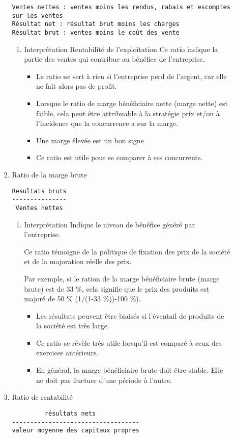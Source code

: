 \documentclass[11pt]{article}
\begin{document}
\begin{enumerate}
\begin{enumerate}
\begin{enumerate}
\begin{verbatim}
Ventes nettes : ventes moins les rendus, rabais et escomptes sur les ventes
Résultat net : résultat brut moins les charges
Résultat brut : ventes moins le coût des vente
\end{verbatim}
\begin{enumerate}
\item Interprétation
\label{sec:org16278c2}
Rentabilité de l'exploitation
Ce ratio indique la partie des ventes qui contribue au bénéfice de l'entreprise.
\begin{itemize}
\item Le ratio ne sert à rien si l'entreprise perd de l'argent, car elle ne fait
alors pas de profit.
\item Lorsque le ratio de marge bénéficiaire nette (marge nette) est faible, cela
peut être attribuable à la stratégie prix et/ou à l'incidence que la
concurrence a sur la marge.
\item Une marge élevée est un bon signe
\item Ce ratio est utile pour se comparer à ses concurrents.
\end{itemize}
\end{enumerate}
\item Ratio de la marge brute
\label{sec:orgbc4a7e3}
\begin{verbatim}
Resultats bruts
---------------
 Ventes nettes
\end{verbatim}
\begin{enumerate}
\item Interprétation
\label{sec:orgfa19ade}
Indique le niveau de bénéfice généré par l'entreprise.

Ce ratio témoigne de la politique de fixation des prix de la société et de la majoration
réelle des prix.

Par exemple, si le ration de la marge bénéficiaire brute (marge brute) est de 33 \%,
cela signifie que le prix des produits est majoré de 50 \% (1/(1-33 \%))-100 \%).
\begin{itemize}
\item Les résultats peuvent être biaisés si l'éventail de produits de la société est
très large.
\item Ce ratio se révèle très utile lorsqu'il est comparé à ceux des exercices
antérieurs.
\item En général, la marge bénéficiaire brute doit être stable. Elle ne doit pas
fluctuer d'une période à l'autre.
\end{itemize}
\end{enumerate}
\item Ratio de rentabilité
\label{sec:org7dda9b4}
\begin{verbatim}
         résultats nets
-----------------------------------
valeur moyenne des capitaux propres


\end{verbatim}
\end{enumerate}
\end{enumerate}
\end{enumerate}
\end{document}

